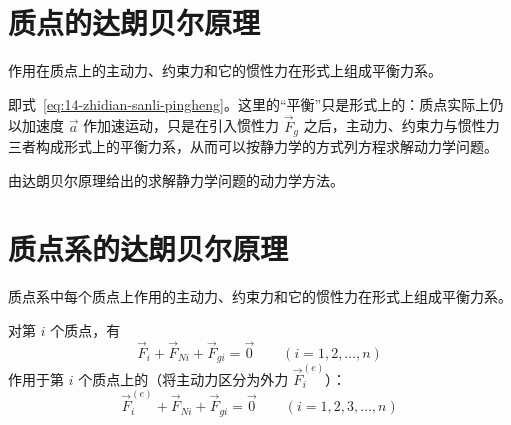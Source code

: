 \section{质点的达朗贝尔原理}

\begin{theorem}[质点的达朗贝尔原理]
作用在质点上的主动力、约束力和它的惯性力在形式上组成平衡力系。
\end{theorem}

即式~\eqref{eq:14-zhidian-sanli-pingheng}。这里的“平衡”只是形式上的：质点实际上仍以加速度 $\vec{a}$ 作加速运动，只是在引入惯性力 $\vec{F}_g$ 之后，主动力、约束力与惯性力三者构成形式上的平衡力系，从而可以按静力学的方式列方程求解动力学问题。

\begin{definition}[动静法]
由达朗贝尔原理给出的求解静力学问题的动力学方法。
\end{definition}

\section{质点系的达朗贝尔原理}

\begin{theorem}[质点系的达朗贝尔原理]
质点系中每个质点上作用的主动力、约束力和它的惯性力在形式上组成平衡力系。
\end{theorem}

对第 $i$ 个质点，有
\begin{equation}\label{eq:14-dui-di-i-zhidian}
  \vec{F}_i + \vec{F}_{Ni} + \vec{F}_{gi} = \vec{0} \qquad (i = 1, 2, \dots, n)
\end{equation}
作用于第 $i$ 个质点上的（将主动力区分为外力 $\vec{F}_i^{(e)}$）：
\begin{equation}\label{eq:14-dui-di-i-zhidian-waili}
  \vec{F}_i^{(e)} + \vec{F}_{Ni} + \vec{F}_{gi} = \vec{0} \qquad (i = 1, 2, 3, \dots, n)
\end{equation}

